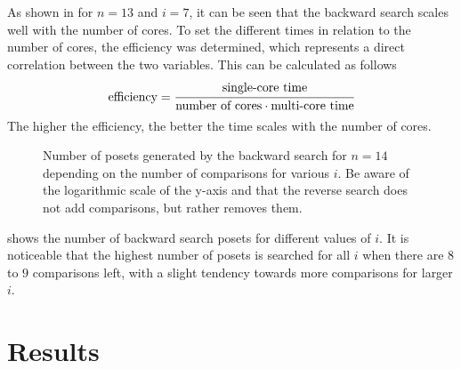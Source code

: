 \documentclass[twoside,leqno,twocolumn]{article}
\begin{document}
As shown in  for $n = 13$ and $i = 7$, it can be seen that the backward search scales well with the number of cores.
To set the different times in relation to the number of cores, the efficiency was determined, which represents a direct correlation between the two variables.
This can be calculated as follows
\[
  \text{efficiency} = \cfrac{\text{single-core time}}{\text{number of cores} \cdot \text{multi-core time}}
\]
The higher the efficiency, the better the time scales with the number of cores.

\begin{figure}[!b]
  \centering
  
  \caption{Number of posets generated by the backward search for $n = 14$ depending on the number of comparisons for various $i$. Be aware of the logarithmic scale of the y-axis and that the reverse search does not add comparisons, but rather removes them.}
  \label{fig:backward-posets-per-level}
\end{figure}

 shows the number of backward search posets for different values of $i$.
It is noticeable that the highest number of posets is searched for all $i$ when there are $8$ to $9$ comparisons left, with a slight tendency towards more comparisons for larger $i$.


\section{Results}
\end{document}

